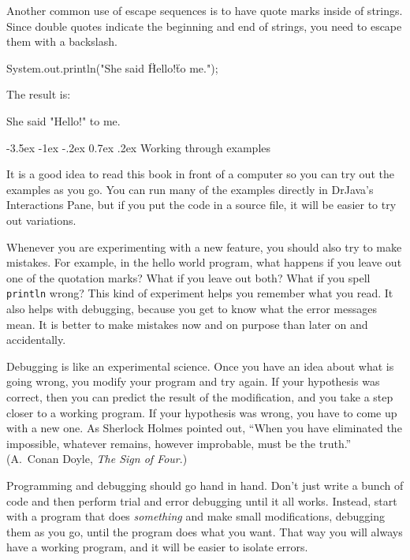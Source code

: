 \documentclass[12pt]{book}
\makeatletter
\renewcommand{\section}{\@startsection {section}{1}{\z@}%
    {-3.5ex \@plus -1ex \@minus -.2ex}%
    {0.7ex \@plus.2ex}%
    {\normalfont\Large\bfseries}}
\theoremstyle{exercise}
\newcommand{\java}[1]{\lstinline{#1}} %
\makeatother
\begin{document}
Another common use of escape sequences is to have quote marks inside of strings.
Since double quotes indicate the beginning and end of strings, you need to escape them with a backslash.

\begin{code}
    System.out.println("She said \"Hello!\" to me.");
\end{code}

The result is:

\begin{stdout}
She said "Hello!" to me.
\end{stdout}


\section{Working through examples}
\label{sec:examples}

It is a good idea to read this book in front of a computer so you can try out the examples as you go.
You can run many of the examples directly in DrJava's Interactions Pane, but if you put the code in a source file, it will be easier to try out variations.

Whenever you are experimenting with a new feature, you should also try to make mistakes.
For example, in the hello world program, what happens if you leave out one of the quotation marks?
What if you leave out both?
What if you spell \java{println} wrong?
This kind of experiment helps you remember what you read.
It also helps with debugging, because you get to know what the error messages mean.
It is better to make mistakes now and on purpose than later on and accidentally.



Debugging is like an experimental science.
Once you have an idea about what is going wrong, you modify your program and try again.
If your hypothesis was correct, then you can predict the result of the modification, and you take a step closer to a working program.
If your hypothesis was wrong, you have to come up with a new one.
As Sherlock Holmes pointed out, ``When you have eliminated the impossible, whatever remains, however improbable, must be the truth.''
(A.~Conan Doyle, {\em The Sign of Four}.)

Programming and debugging should go hand in hand.
Don't just write a bunch of code and then perform trial and error debugging until it all works.
Instead, start with a program that does {\em something} and make small modifications, debugging them as you go, until the program does what you want.
That way you will always have a working program, and it will be easier to isolate errors.
\end{document}
